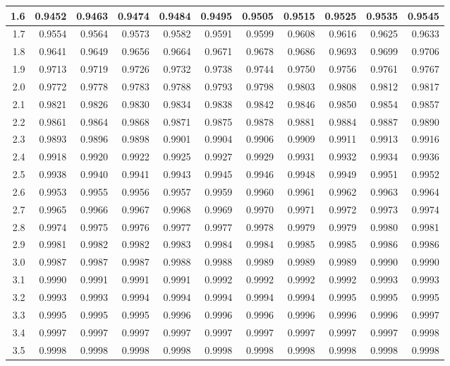 \begin{center}
\begin{tabular}{|r|r@{\ }r@{\ }r@{\ }r@{\ }r@{\ }r@{\ }r@{\ }r@{\ }r@{\ }r@{\ }|}
    \hline
    1.6&0.9452&0.9463&0.9474&0.9484&0.9495&0.9505&0.9515&0.9525&0.9535&0.9545\\
    \hline
    1.7&0.9554&0.9564&0.9573&0.9582&0.9591&0.9599&0.9608&0.9616&0.9625&0.9633\\
    \hline
    1.8&0.9641&0.9649&0.9656&0.9664&0.9671&0.9678&0.9686&0.9693&0.9699&0.9706\\
    \hline
    1.9&0.9713&0.9719&0.9726&0.9732&0.9738&0.9744&0.9750&0.9756&0.9761&0.9767\\
    \hline
    2.0&0.9772&0.9778&0.9783&0.9788&0.9793&0.9798&0.9803&0.9808&0.9812&0.9817\\
    \hline
    2.1&0.9821&0.9826&0.9830&0.9834&0.9838&0.9842&0.9846&0.9850&0.9854&0.9857\\
    \hline
    2.2&0.9861&0.9864&0.9868&0.9871&0.9875&0.9878&0.9881&0.9884&0.9887&0.9890\\
    \hline
    2.3&0.9893&0.9896&0.9898&0.9901&0.9904&0.9906&0.9909&0.9911&0.9913&0.9916\\
    \hline
    2.4&0.9918&0.9920&0.9922&0.9925&0.9927&0.9929&0.9931&0.9932&0.9934&0.9936\\
    \hline
    2.5&0.9938&0.9940&0.9941&0.9943&0.9945&0.9946&0.9948&0.9949&0.9951&0.9952\\
    \hline
    2.6&0.9953&0.9955&0.9956&0.9957&0.9959&0.9960&0.9961&0.9962&0.9963&0.9964\\
    \hline
    2.7&0.9965&0.9966&0.9967&0.9968&0.9969&0.9970&0.9971&0.9972&0.9973&0.9974\\
    \hline
    2.8&0.9974&0.9975&0.9976&0.9977&0.9977&0.9978&0.9979&0.9979&0.9980&0.9981\\
    \hline
    2.9&0.9981&0.9982&0.9982&0.9983&0.9984&0.9984&0.9985&0.9985&0.9986&0.9986\\
    \hline
    3.0&0.9987&0.9987&0.9987&0.9988&0.9988&0.9989&0.9989&0.9989&0.9990&0.9990\\
    \hline
    3.1&0.9990&0.9991&0.9991&0.9991&0.9992&0.9992&0.9992&0.9992&0.9993&0.9993\\
    \hline
    3.2&0.9993&0.9993&0.9994&0.9994&0.9994&0.9994&0.9994&0.9995&0.9995&0.9995\\
    \hline
    3.3&0.9995&0.9995&0.9995&0.9996&0.9996&0.9996&0.9996&0.9996&0.9996&0.9997\\
    \hline
    3.4&0.9997&0.9997&0.9997&0.9997&0.9997&0.9997&0.9997&0.9997&0.9997&0.9998\\
    \hline
    3.5&0.9998&0.9998&0.9998&0.9998&0.9998&0.9998&0.9998&0.9998&0.9998&0.9998\\

\end{tabular}
\end{center}
